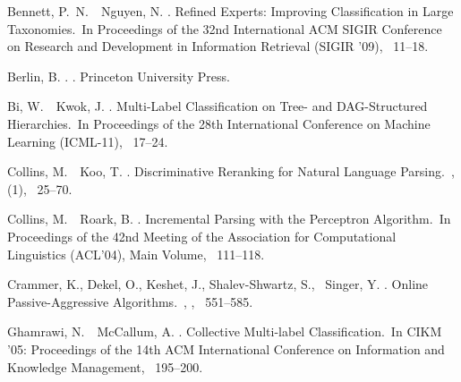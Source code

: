 \documentclass[japanese]{jnlp_1.4}
\begin{document}

\begin{thebibliography}{}

Bennett, P.~N.\BBACOMMA\ \BBA\ Nguyen, N. \BBCP.
\newblock \BBOQ Refined Experts: Improving Classification in Large
  Taxonomies.\BBCQ\
\newblock In {\Bem Proceedings of the 32nd International ACM SIGIR Conference
  on Research and Development in Information Retrieval (SIGIR '09)},
  \mbox{\BPGS\ 11--18}.

Berlin, B. \BBCP.
.
\newblock Princeton University Press.

Bi, W.\BBACOMMA\ \BBA\ Kwok, J. \BBCP.
\newblock \BBOQ Multi-Label Classification on Tree- and {DAG}-Structured
  Hierarchies.\BBCQ\
\newblock In {\Bem Proceedings of the 28th International Conference on Machine
  Learning (ICML-11)}, \mbox{\BPGS\ 17--24}.

Collins, M.\BBACOMMA\ \BBA\ Koo, T. \BBCP.
\newblock \BBOQ Discriminative Reranking for Natural Language Parsing.\BBCQ\
, {}  (1), \mbox{\BPGS\
  25--70}.

Collins, M.\BBACOMMA\ \BBA\ Roark, B. \BBOP 2004\BBCP.
\newblock \BBOQ Incremental Parsing with the {P}erceptron Algorithm.\BBCQ\
\newblock In {\Bem Proceedings of the 42nd Meeting of the Association for
  Computational Linguistics (ACL'04), Main Volume}, \mbox{\BPGS\ 111--118}.

Crammer, K., Dekel, O., Keshet, J., Shalev-Shwartz, S., \BBA\ Singer, Y. \BBOP
  2006\BBCP.
\newblock \BBOQ Online Passive-Aggressive Algorithms.\BBCQ\
, {}, \mbox{\BPGS\
  551--585}.

Ghamrawi, N.\BBACOMMA\ \BBA\ McCallum, A. \BBOP 2005\BBCP.
\newblock \BBOQ Collective Multi-label Classification.\BBCQ\
\newblock In {\Bem CIKM '05: Proceedings of the 14th ACM International
  Conference on Information and Knowledge Management}, \mbox{\BPGS\ 195--200}.


\end{thebibliography}
\end{document}
